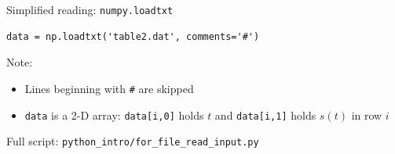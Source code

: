 \begin{frame}[fragile]{Simplified reading: \texttt{numpy.loadtxt}}
\begin{lstlisting}[style=pythoncompact]
data = np.loadtxt('table2.dat', comments='#')
\end{lstlisting}
  Note:
  \begin{itemize}
    \item Lines beginning with \texttt{\#} are skipped
    \item \texttt{data} is a 2-D array: \texttt{data[i,0]} holds $t$
          and \texttt{data[i,1]} holds $s(t)$ in row $i$
  \end{itemize}
  Full script: \texttt{python\_intro/for\_file\_read\_input.py}
\end{frame}
